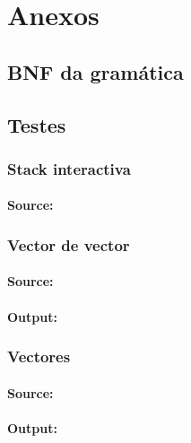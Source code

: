 \chapter{Anexos}

\section{BNF da gramática}


\newpage
\flushbottom
\section{Testes}
\lstset{language=Pascal,
extendedchars=\true,
inputencoding=utf8x}
{
\fontsize{9pt}{9}\selectfont

\subsection*{Stack interactiva}
\subsubsection*{Source:}


\subsection*{Vector de vector}
\subsubsection*{Source:}

\subsubsection*{Output:}


\newpage
\subsection*{Vectores}
\subsubsection*{Source:}

\subsubsection*{Output:}


\flushbottom
}
